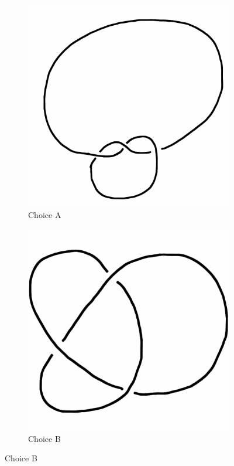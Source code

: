 \documentclass[12pt,letterpaper]{article}
\theoremstyle{definition}
\begin{document}
\begin{figure}[h!]
    \begin{subfigure}[b]{0.4\textwidth}
        \includegraphics[width=\textwidth]{knotpics/9SeptQ2a.png}
        \caption{Choice A}
    \end{subfigure}
    \hspace{2cm}
    \begin{subfigure}[b]{0.4\textwidth}
        \includegraphics[width=\textwidth]{knotpics/9SeptQ2b.png}
        \caption{Choice B}
    \end{subfigure}
\end{figure}
\end{document}
